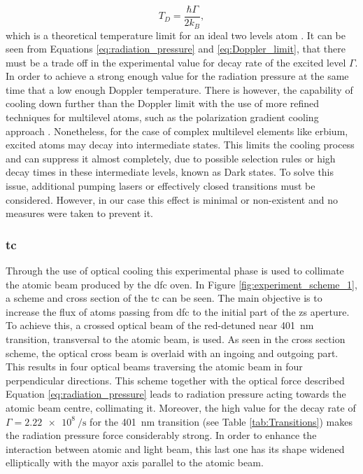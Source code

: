 \begin{equation}\label{eq:Doppler_limit}
	T_D = \frac{\hbar \Gamma}{2 k_B},
\end{equation}
which is a theoretical temperature limit for an ideal two levels atom \cite{Metcalf1999}. It can be seen from Equations \eqref{eq:radiation_pressure} and \eqref{eq:Doppler_limit}, that there must be a trade off in the experimental value for decay rate of the excited level $\Gamma$. In order to achieve a strong enough value for the radiation pressure at the same time that a low enough Doppler temperature. There is however, the capability of cooling down further than the Doppler limit with the use of more refined techniques for multilevel atoms, such as the polarization gradient cooling approach \cite{Dalibard1989}. Nonetheless, for the case of complex multilevel elements like erbium, excited atoms may decay into intermediate states. This limits the cooling process and can suppress it almost completely, due to possible selection rules or high decay times in these intermediate levels, known as Dark states. To solve this issue, additional pumping lasers or effectively closed transitions must be considered. However, in our case this effect is minimal or non-existent and no measures were taken to prevent it. 

\subsubsection{\Acl{tc}}

Through the use of optical cooling this experimental phase is used to collimate the atomic beam produced by the \ac{dfc} oven. In Figure \ref{fig:experiment_scheme_1}, a scheme and cross section of the \ac{tc} can be seen. The main objective is to increase the flux of atoms passing from \ac{dfc} to the initial part of the \ac{zs} aperture. To achieve this, a crossed optical beam of the red-detuned near \SI{401}{\nano\meter} transition, transversal to the atomic beam, is used. As seen in the cross section scheme, the optical cross beam is overlaid with an ingoing and outgoing part. This results in four optical beams traversing the atomic beam in four perpendicular directions. This scheme together with the optical force described Equation \ref{eq:radiation_pressure} leads to radiation pressure acting towards the atomic beam centre, collimating it. Moreover, the high value for the decay rate of $\Gamma = \SI{2.22e8}{\per\second}$ for the \SI{401}{\nano\meter} transition (see Table \ref{tab:Transitions}) makes the radiation pressure force considerably strong. In order to enhance the interaction between atomic and light beam, this last one has its shape widened elliptically with the mayor axis parallel to the atomic beam.


